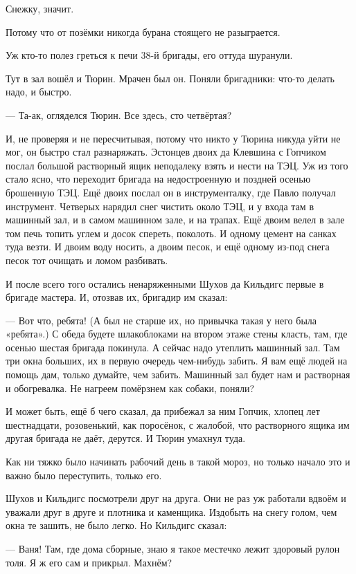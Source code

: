 Снежку, значит.

Потому что от позёмки никогда бурана стоящего не разыграется.

Уж кто-то полез греться к печи 38-й бригады, его оттуда шуранули.

Тут в зал вошёл и Тюрин. Мрачен был он. Поняли бригадники: что-то делать надо, и быстро.

--- Та-ак, \dash огляделся Тюрин. \Dash Все здесь, сто четвёртая?

И, не проверяя и не пересчитывая, потому что никто у Тюрина никуда уйти не мог, он быстро стал
разнаряжать. Эстонцев двоих да Клевшина с Гопчиком послал большой растворный ящик
неподалеку взять и нести на ТЭЦ. Уж из того стало ясно, что переходит бригада на
недостроенную и поздней осенью брошенную ТЭЦ. Ещё двоих послал он в инструменталку, где
Павло получал инструмент. Четверых нарядил снег чистить около ТЭЦ, и у входа там в машинный
зал, и в самом машинном зале, и на трапах. Ещё двоим велел в зале том печь топить \dash углем и
досок спереть, поколоть. И одному цемент на санках туда везти. И двоим воду носить, а двоим
песок, и ещё одному из-под снега песок тот очищать и ломом разбивать.

И после всего того остались ненаряженными Шухов да Кильдигс \dash первые в бригаде мастера. И,
отозвав их, бригадир им сказал:

--- Вот что, ребята! \dash (А был не старше их, но привычка такая у него была \dash «ребята».) \Dash С обеда
будете шлакоблоками на втором этаже стены класть, там, где осенью шестая бригада покинула. А
сейчас надо утеплить машинный зал. Там три окна больших, их в первую очередь чем-нибудь
забить. Я вам ещё людей на помощь дам, только думайте, чем забить. Машинный зал будет нам и
растворная и обогревалка. Не нагреем \dash помёрзнем как собаки, поняли?

И может быть, ещё б чего сказал, да прибежал за ним Гопчик, хлопец лет шестнадцати,
розовенький, как поросёнок, с жалобой, что растворного ящика им другая бригада не даёт,
дерутся. И Тюрин умахнул туда.

Как ни тяжко было начинать рабочий день в такой мороз, но только начало это и важно было
переступить, только его.

Шухов и Кильдигс посмотрели друг на друга. Они не раз уж работали вдвоём и уважали друг в
друге и плотника и каменщика. Издобыть на снегу голом, чем окна те зашить, не было легко. Но
Кильдигс сказал:

--- Ваня! Там, где дома сборные, знаю я такое местечко \dash лежит здоровый рулон толя. Я ж его сам и
прикрыл. Махнём?

